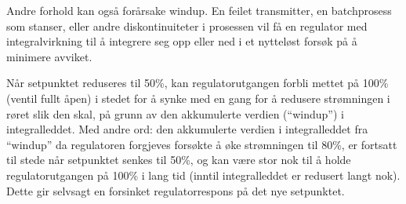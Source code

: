 





Andre forhold kan også forårsake windup. En feilet transmitter, en batchprosess som stanser, eller andre diskontinuiteter i prosessen vil få en regulator med integralvirkning til å integrere seg opp eller ned i et nytteløst forsøk på å minimere avviket.

Når setpunktet reduseres til 50\%, kan regulatorutgangen forbli mettet på 100\% (ventil fullt åpen) i stedet for å synke med en gang for å redusere strømningen i røret slik den skal, på grunn av den akkumulerte verdien (``windup'') i integralleddet. Med andre ord: den akkumulerte verdien i integralleddet fra ``windup'' da regulatoren forgjeves forsøkte å øke strømningen til 80\%, er fortsatt til stede når setpunktet senkes til 50\%, og kan være stor nok til å holde regulatorutgangen på 100\% i lang tid (inntil integralleddet er redusert langt nok). Dette gir selvsagt en forsinket regulatorrespons på det nye setpunktet.


